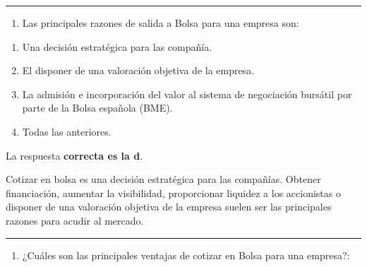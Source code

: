 \documentclass[
  letterpaper,
  DIV=11,
  numbers=noendperiod]{scrreprt}
\providecommand{\tightlist}{%
  \setlength{\itemsep}{0pt}\setlength{\parskip}{0pt}}\usepackage{longtable,booktabs,array}
\begin{document}
\begin{tcolorbox}[enhanced jigsaw, left=2mm, opacityback=0, colback=white, breakable, arc=.35mm, bottomrule=.15mm, rightrule=.15mm, toprule=.15mm, leftrule=.75mm, colframe=quarto-callout-tip-color-frame]
\begin{minipage}[t]{\textwidth - 5.5mm}
\end{minipage}%
\end{tcolorbox}

\begin{center}\rule{0.5\linewidth}{0.5pt}\end{center}

\begin{enumerate}
\def\labelenumi{\arabic{enumi}.}
\setcounter{enumi}{18}
\tightlist
\item
  Las principales razones de salida a Bolsa para una empresa son:
\end{enumerate}

\begin{enumerate}
\def\labelenumi{\alph{enumi})}
\item
  Una decisión estratégica para las compañía.
\item
  El disponer de una valoración objetiva de la empresa.
\item
  La admisión e incorporación del valor al sistema de negociación
  bursátil por parte de la Bolsa española (BME).
\item
  Todas las anteriores.
\end{enumerate}

\begin{tcolorbox}[enhanced jigsaw, left=2mm, opacityback=0, colback=white, breakable, arc=.35mm, bottomrule=.15mm, rightrule=.15mm, toprule=.15mm, leftrule=.75mm, colframe=quarto-callout-tip-color-frame]
\begin{minipage}[t]{5.5mm}
\textcolor{quarto-callout-tip-color}{\faLightbulb}
\end{minipage}%
\begin{minipage}[t]{\textwidth - 5.5mm}

La respuesta \textbf{correcta es la d}.

Cotizar en bolsa es una decisión estratégica para las compañías. Obtener
financiación, aumentar la visibilidad, proporcionar liquidez a los
accionistas o disponer de una valoración objetiva de la empresa suelen
ser las principales razones para acudir al mercado.

\end{minipage}%
\end{tcolorbox}

\begin{center}\rule{0.5\linewidth}{0.5pt}\end{center}

\begin{enumerate}
\def\labelenumi{\arabic{enumi}.}
\setcounter{enumi}{19}
\tightlist
\item
  ¿Cuáles son las principales ventajas de cotizar en Bolsa para una
  empresa?:
\end{enumerate}
\end{document}

